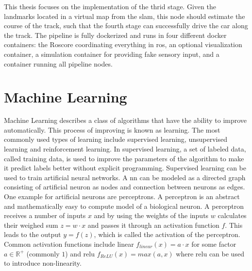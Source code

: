 This thesis focuses on the implementation of the thrid stage. Given the landmarks located in a virtual map from the \ac{slam}, this node should estimate the course of the track, such that the fourth stage can successfully drive the car along the track.
The pipeline is fully dockerized and runs in four different docker containers: the Roscore coordinating everything in \ac{ros}, an optional visualization container, a simulation container for providing fake sensory input, and a container running all pipeline nodes.

\section{Machine Learning}
Machine Learning describes a class of algorithms that have the ability to improve automatically. This process of improving is known as learning. The most commonly used types of learning include supervised learning, unsupervised learning and reinforcement learning\cite{Dey2016}. In supervised learning, a set of labeled data, called training data, is used to improve the parameters of the algorithm to make it predict labels better without explicit programming. Supervised learning can be used to train artificial neural networks. A \ac{nn} can be modeled as a directed graph consisting of artificial neuron as nodes and connection between neurons as edges. One example for artificial neurons are perceptrons. A perceptron is an abstract and mathematically easy to compute model of a biological neuron. A perceptron receives a number of inputs $x$ and by using the weights of the inputs $w$ calculates their weighed sum $z=w \cdot x$ and passes it through an activation function $f$. This leads to the output
$y=f(z)$, which is called the activation of the perceptron. Common activation functions include linear $f_{linear}(x)=a \cdot x$ for some factor $a \in \mathbb{R^+}$ (commonly $1$) and \ac{relu} $f_{ReLU}(x)=max(a,x)$ \cite{Ramachandran2017} where \ac{relu} can be used to introduce non-linearity.

